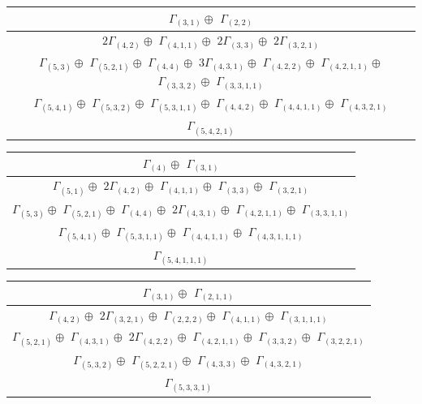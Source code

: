 \documentclass[main.tex]{subfiles}
\begin{document}
\bigskip
\begin{minipage}{1\textwidth}
\centering
\begin{tabular}{c}
$\Gamma_{(
3 , 
1
)} \oplus$
$\Gamma_{(
2 , 
2
)}$
\\ \hline
$ 2 \Gamma_{(
4 , 
2
)} \oplus$
$\Gamma_{(
4 , 
1 , 
1
)} \oplus$
$ 2 \Gamma_{(
3 , 
3
)} \oplus$
$ 2 \Gamma_{(
3 , 
2 , 
1
)}$
\\ \hline
$\Gamma_{(
5 , 
3
)} \oplus$
$\Gamma_{(
5 , 
2 , 
1
)} \oplus$
$\Gamma_{(
4 , 
4
)} \oplus$
$ 3 \Gamma_{(
4 , 
3 , 
1
)} \oplus$
$\Gamma_{(
4 , 
2 , 
2
)} \oplus$
$\Gamma_{(
4 , 
2 , 
1 , 
1
)} \oplus$
$\Gamma_{(
3 , 
3 , 
2
)} \oplus$
$\Gamma_{(
3 , 
3 , 
1 , 
1
)}$
\\ \hline
$\Gamma_{(
5 , 
4 , 
1
)} \oplus$
$\Gamma_{(
5 , 
3 , 
2
)} \oplus$
$\Gamma_{(
5 , 
3 , 
1 , 
1
)} \oplus$
$\Gamma_{(
4 , 
4 , 
2
)} \oplus$
$\Gamma_{(
4 , 
4 , 
1 , 
1
)} \oplus$
$\Gamma_{(
4 , 
3 , 
2 , 
1
)}$
\\ \hline
$\Gamma_{(
5 , 
4 , 
2 , 
1
)}$
\\
\end{tabular}\end{minipage}
\bigskip
\begin{minipage}{1\textwidth}
\centering
\begin{tabular}{c}
$\Gamma_{(
4
)} \oplus$
$\Gamma_{(
3 , 
1
)}$
\\ \hline
$\Gamma_{(
5 , 
1
)} \oplus$
$ 2 \Gamma_{(
4 , 
2
)} \oplus$
$\Gamma_{(
4 , 
1 , 
1
)} \oplus$
$\Gamma_{(
3 , 
3
)} \oplus$
$\Gamma_{(
3 , 
2 , 
1
)}$
\\ \hline
$\Gamma_{(
5 , 
3
)} \oplus$
$\Gamma_{(
5 , 
2 , 
1
)} \oplus$
$\Gamma_{(
4 , 
4
)} \oplus$
$ 2 \Gamma_{(
4 , 
3 , 
1
)} \oplus$
$\Gamma_{(
4 , 
2 , 
1 , 
1
)} \oplus$
$\Gamma_{(
3 , 
3 , 
1 , 
1
)}$
\\ \hline
$\Gamma_{(
5 , 
4 , 
1
)} \oplus$
$\Gamma_{(
5 , 
3 , 
1 , 
1
)} \oplus$
$\Gamma_{(
4 , 
4 , 
1 , 
1
)} \oplus$
$\Gamma_{(
4 , 
3 , 
1 , 
1 , 
1
)}$
\\ \hline
$\Gamma_{(
5 , 
4 , 
1 , 
1 , 
1
)}$
\\
\end{tabular}\end{minipage}
\bigskip
\begin{minipage}{1\textwidth}
\centering
\begin{tabular}{c}
$\Gamma_{(
3 , 
1
)} \oplus$
$\Gamma_{(
2 , 
1 , 
1
)}$
\\ \hline
$\Gamma_{(
4 , 
2
)} \oplus$
$ 2 \Gamma_{(
3 , 
2 , 
1
)} \oplus$
$\Gamma_{(
2 , 
2 , 
2
)} \oplus$
$\Gamma_{(
4 , 
1 , 
1
)} \oplus$
$\Gamma_{(
3 , 
1 , 
1 , 
1
)}$
\\ \hline
$\Gamma_{(
5 , 
2 , 
1
)} \oplus$
$\Gamma_{(
4 , 
3 , 
1
)} \oplus$
$ 2 \Gamma_{(
4 , 
2 , 
2
)} \oplus$
$\Gamma_{(
4 , 
2 , 
1 , 
1
)} \oplus$
$\Gamma_{(
3 , 
3 , 
2
)} \oplus$
$\Gamma_{(
3 , 
2 , 
2 , 
1
)}$
\\ \hline
$\Gamma_{(
5 , 
3 , 
2
)} \oplus$
$\Gamma_{(
5 , 
2 , 
2 , 
1
)} \oplus$
$\Gamma_{(
4 , 
3 , 
3
)} \oplus$
$\Gamma_{(
4 , 
3 , 
2 , 
1
)}$
\\ \hline
$\Gamma_{(
5 , 
3 , 
3 , 
1
)}$
\\
\end{tabular}\end{minipage}
\end{document}
